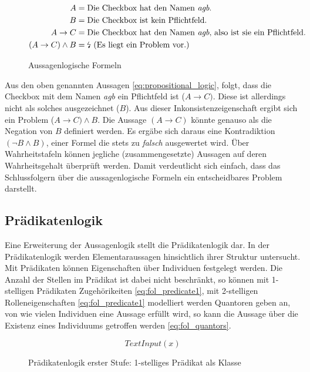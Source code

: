 \documentclass[runningheads,a4paper]{llncs}
\begin{document}
\begin{figure}
\begin{align}
\begin{split}
A &= \textnormal{Die Checkbox hat den Namen \textit{agb}.}\\
B &= \textnormal{Die Checkbox ist kein Pflichtfeld.}\\
A \to C &= \textnormal{Die Checkbox hat den Namen \textit{agb}, also ist sie ein Pflichtfeld.}\\
(A \to C) \land B &= \textnormal{\lightning\ (Es liegt ein Problem vor.)}
\label{eq:propositional_logic}
\end{split}
\end{align}
\caption{Aussagenlogische Formeln}
\end{figure}
 
Aus den oben genannten Aussagen \eqref{eq:propositional_logic}, folgt, dass die Checkbox mit dem Namen \textit{agb} ein Pflichtfeld ist (\(A \to C)\). 
Diese ist allerdings nicht als solches ausgezeichnet (\(B\)). 
Aus dieser Inkonsistenzeigenschaft ergibt sich ein Problem (\(A \to C) \land B\). 
Die Aussage \((A \to C)\) könnte genauso als die Negation von \(B\) definiert werden. 
Es ergäbe sich daraus eine Kontradiktion \((\neg B \land B)\), einer Formel die stets zu \textit{falsch} ausgewertet wird. 
Über Wahrheitstafeln können jegliche (zusammengesetzte) Aussagen auf deren Wahrheitsgehalt überprüft werden. 
Damit verdeutlicht sich einfach, dass das Schlussfolgern über die aussagenlogische Formeln ein entscheidbares Problem darstellt.
\\

\subsection{Prädikatenlogik}
\label{sec:prediactelogic}

Eine Erweiterung der Aussagenlogik stellt die Prädikatenlogik dar.
In der Prädikatenlogik werden Elementaraussagen hinsichtlich ihrer Struktur untersucht.
Mit Prädikaten können Eigenschaften über Individuen festgelegt werden. 
Die Anzahl der Stellen im Prädikat ist dabei nicht beschränkt, so können mit 1-stelligen Prädikaten Zugehörikeiten \eqref{eq:fol_predicate1}, mit 2-stelligen Rolleneigenschaften \eqref{eq:fol_predicate1} modelliert werden  
Quantoren geben an, von wie vielen Individuen eine Aussage erfüllt wird, so kann die Aussage über die Existenz eines Individuums getroffen werden \eqref{eq:fol_quantors}.
\begin{figure}
\begin{equation}
TextInput(x)
\label{eq:fol_predicate1}
\end{equation}
\caption{Prädikatenlogik erster Stufe: 1-stelliges Prädikat als Klasse}
\end{figure}
\end{document}
